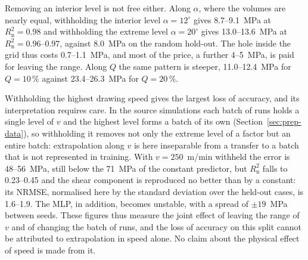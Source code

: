 Removing an interior level is not free either. Along $\alpha$, where the volumes are nearly equal, withholding the interior level $\alpha=12^\circ$ gives 8.7--9.1~MPa at $R^2_{\mathrm{n}}=0.98$ and withholding the extreme level $\alpha=20^\circ$ gives 13.0--13.6~MPa at $R^2_{\mathrm{n}}=0.96$--$0.97$, against 8.0~MPa on the random hold-out. The hole inside the grid thus costs 0.7--1.1~MPa, and most of the price, a further 4--5~MPa, is paid for leaving the range.
Along $Q$ the same pattern is steeper, 11.0--12.4~MPa for $Q=10\,\%$ against 23.4--26.3~MPa for $Q=20\,\%$.

Withholding the highest drawing speed gives the largest loss of accuracy, and its interpretation requires care. In the source simulations each batch of runs holds a single level of $v$ and the highest level forms a batch of its own (Section~\ref{sec:prep-data}), so withholding it removes not only the extreme level of a factor but an entire batch: extrapolation along $v$ is here inseparable from a transfer to a batch that is not represented in training. With $v=250$~m/min withheld the error is 48--56~MPa, still below the 71~MPa of the constant predictor, but $R^2_{\mathrm{n}}$ falls to 0.23--0.45 and the shear component is reproduced no better than by a constant: its NRMSE, normalised here by the standard deviation over the held-out cases, is 1.6--1.9. The MLP, in addition, %
becomes unstable, with a spread of $\pm19$~MPa between seeds. These figures thus measure the joint effect of leaving the range of $v$ and of changing the batch of runs, and the loss of accuracy on this split cannot be attributed to extrapolation in speed alone. No claim about the physical effect of speed is made from it. %


